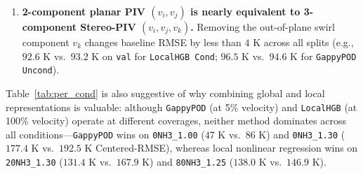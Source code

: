 \documentclass[11pt,letterpaper]{article}
\begin{document}
\begin{enumerate}
    \item \textbf{2-component planar PIV $(v_i, v_j)$ is nearly equivalent to 3-component Stereo-PIV $(v_i, v_j, v_k)$.} Removing the out-of-plane swirl component $v_k$ changes baseline RMSE by less than $4\text{ K}$ across all splits (e.g., $92.6\text{ K}$ vs.\ $93.2\text{ K}$ on \texttt{val} for \texttt{LocalHGB Cond}; $96.5\text{ K}$ vs.\ $94.6\text{ K}$ for \texttt{GappyPOD Uncond}).
\end{enumerate}

\begin{table}[H]
\centering
\caption{Per-condition comparison of the four held-out extrapolation conditions against their nearest training-set neighbors (evaluated on held-out future frames $1600\text{--}2000$), showing that large flame-front fluctuations occur in rich regimes ($\phi \ge 1.20$) both inside and outside the training range.}
\label{tab:per_cond}
\end{table}

Table~\ref{tab:per_cond} is also suggestive of why combining global and local representations is valuable: although \texttt{GappyPOD} (at 5\% velocity) and \texttt{LocalHGB} (at 100\% velocity) operate at different coverages, neither method dominates across all conditions---\texttt{GappyPOD} wins on \texttt{0NH3\_1.00} ($47\text{ K}$ vs.\ $86\text{ K}$) and \texttt{0NH3\_1.30} ($177.4\text{ K}$ vs.\ $192.5\text{ K}$ Centered-RMSE), whereas local nonlinear regression wins on \texttt{20NH3\_1.30} ($131.4\text{ K}$ vs.\ $167.9\text{ K}$) and \texttt{80NH3\_1.25} ($138.0\text{ K}$ vs.\ $146.9\text{ K}$).
\end{document}
